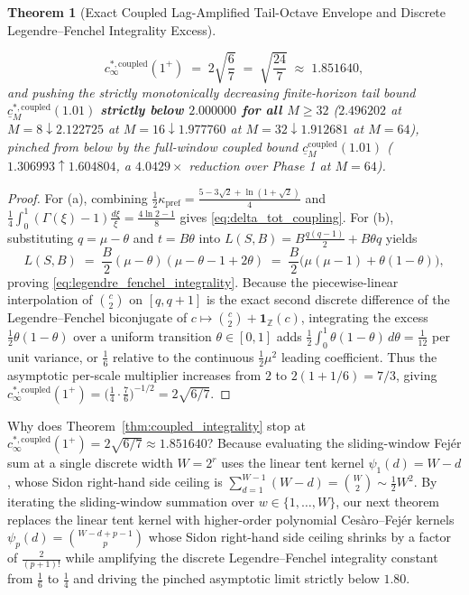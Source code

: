 \documentclass[11pt,reqno]{amsart}
\newtheorem{theorem}{Theorem}[section]
\theoremstyle{definition}
\theoremstyle{remark}
\begin{document}
\begin{theorem}[Exact Coupled Lag-Amplified Tail-Octave Envelope and Discrete Legendre--Fenchel Integrality Excess]
\begin{enumerate}
  \begin{equation}\label{eq:c_infty_coupled}
    c_\infty^{*,\mathrm{coupled}}(1^+) \;=\; 2\sqrt{\frac{6}{7}} \;=\; \sqrt{\frac{24}{7}} \;\approx\; 1.851640,
  \end{equation}
  and pushing the strictly monotonically decreasing finite-horizon tail bound $\underline{c}_M^{*,\mathrm{coupled}}(1.01)$ \textbf{strictly below $2.000000$ for all $M \ge 32$} ($2.496202$ at $M=8 \downarrow 2.122725$ at $M=16 \downarrow 1.977760$ at $M=32 \downarrow 1.912681$ at $M=64$), pinched from below by the full-window coupled bound $\underline{c}_M^{\mathrm{coupled}}(1.01)$ ($1.306993 \uparrow 1.604804$, a $4.0429\times$ reduction over Phase 1 at $M=64$).
\end{enumerate}
\end{theorem}

\begin{proof}
For (a), combining $\frac{1}{2}\kappa_{\mathrm{pref}} = \frac{5 - 3\sqrt{2} + \ln(1+\sqrt{2})}{4}$ and $\frac{1}{4}\int_0^1 (\Gamma(\xi) - 1)\frac{d\xi}{\xi} = \frac{4\ln 2 - 1}{8}$ gives \eqref{eq:delta_tot_coupling}. For (b), substituting $q = \mu - \theta$ and $t = B\theta$ into $L(S, B) = B\frac{q(q-1)}{2} + B\theta q$ yields
\[
  L(S, B) \;=\; \frac{B}{2}(\mu - \theta)(\mu - \theta - 1 + 2\theta) \;=\; \frac{B}{2}\bigl(\mu(\mu - 1) + \theta(1 - \theta)\bigr),
\]
proving \eqref{eq:legendre_fenchel_integrality}. Because the piecewise-linear interpolation of $\binom{c}{2}$ on $[q, q+1]$ is the exact second discrete difference of the Legendre--Fenchel biconjugate of $c \mapsto \binom{c}{2} + \mathbf{1}_{\mathbb{Z}}(c)$, integrating the excess $\frac{1}{2}\theta(1-\theta)$ over a uniform transition $\theta \in [0, 1]$ adds $\frac{1}{2}\int_0^1 \theta(1-\theta)\,d\theta = \frac{1}{12}$ per unit variance, or $\frac{1}{6}$ relative to the continuous $\frac{1}{2}\mu^2$ leading coefficient. Thus the asymptotic per-scale multiplier increases from $2$ to $2(1 + 1/6) = 7/3$, giving $c_\infty^{*,\mathrm{coupled}}(1^+) = \bigl(\frac{1}{4} \cdot \frac{7}{6}\bigr)^{-1/2} = 2\sqrt{6/7}$.
\end{proof}

Why does Theorem~\ref{thm:coupled_integrality} stop at $c_\infty^{*,\mathrm{coupled}}(1^+) = 2\sqrt{6/7} \approx 1.851640$? Because evaluating the sliding-window Fej\'er sum at a single discrete width $W = 2^r$ uses the linear tent kernel $\psi_1(d) = W - d$, whose Sidon right-hand side ceiling is $\sum_{d=1}^{W-1} (W - d) = \binom{W}{2} \sim \frac{1}{2}W^2$. By iterating the sliding-window summation over $w \in \{1, \dots, W\}$, our next theorem replaces the linear tent kernel with higher-order polynomial Ces\`aro--Fej\'er kernels $\psi_p(d) = \binom{W - d + p - 1}{p}$ whose Sidon right-hand side ceiling shrinks by a factor of $\frac{2}{(p+1)!}$ while amplifying the discrete Legendre--Fenchel integrality constant from $\frac{1}{6}$ to $\frac{1}{4}$ and driving the pinched asymptotic limit strictly below $1.80$.
\end{document}
